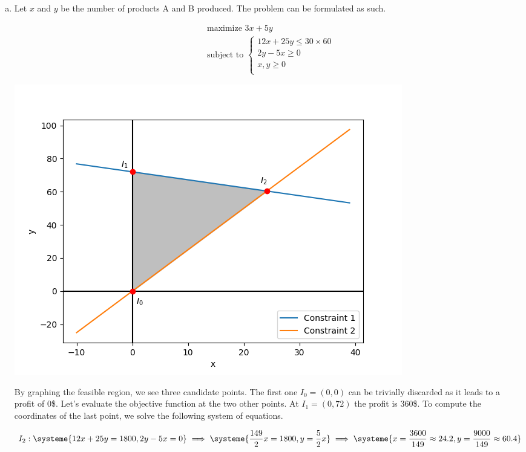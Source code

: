\documentclass[a4paper, 10pt, twoside]{article}
\begin{document}
\begin{enumerate}[a)]
    \item

          Let $x$ and $y$ be the number of products A and B produced. The problem can be formulated as such.

          \begin{align*}
               & \text{maximize } 3x + 5y \\
               & \text{subject to }
              \begin{cases}
                  12 x + 25 y \le 30 \times 60 \\
                  2 y - 5 x \ge 0              \\
                  x,y \ge 0                                 \\
              \end{cases}
          \end{align*}

          \begin{center}
              \includegraphics[width = .5 \textwidth]{graph1.png}
          \end{center}

          By graphing the feasible region, we see three candidate points. The first one $I_0 = (0, 0)$ can be trivially discarded as it leads to a profit of 0\$. Let's evaluate the objective function at the two other points. At $I_1 = (0, 72)$ the profit is 360\$. To compute the coordinates of the last point, we solve the following system of equations.

          \begin{align*}
            I_2 : 
              \systeme{
                  12 x + 25 y = 1800,
                  2 y - 5 x = 0
              }
              \implies
              \systeme{
                  \frac{149}{2}x = 1800,
                  y = \frac{5}{2} x
              }
              \implies
              \systeme{
                  x = \frac{3600}{149} \approx 24.2,
                  y = \frac{9000}{149} \approx 60.4
              }
          \end{align*}


\end{enumerate}
\end{document}

